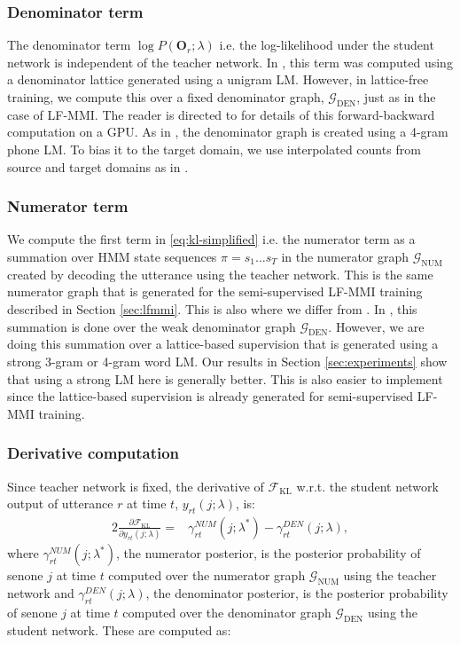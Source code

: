\documentclass{article}
\newcommand{\oOr}[1]{\mathbf{O}_{#1}}
\newcommand{\yr}[1]{y_{#1}}
\newcommand{\pr}{{P}}
\newcommand{\lat}{\mathcal{L}}
\newcommand{\DenG}{\mathcal{G}_\text{DEN}}
\newcommand{\NumG}{\mathcal{G}_\text{NUM}}
\newcommand{\NumPost}[1]{\gamma_{rt}^{NUM}(j;#1)}
\newcommand{\DenPost}[1]{\gamma_{rt}^{DEN}(j;#1)}
\newcommand{\Fkl}{\mathcal{F}_\text{KL}}
\begin{document}
\subsubsection{Denominator term}
The denominator term $\log \pr(\oOr{r}; \lambda)$ 
i.e. the log-likelihood under the student network is independent of 
the teacher network. 
In \cite{wong2016sequence-ts}, this term
was computed using a denominator lattice generated using a unigram LM. 
However, in lattice-free training, we compute this over a 
fixed denominator graph, $\DenG$, just as in the case of LF-MMI. 
The reader is directed to \cite{chain}
for details of this forward-backward \cite{rabiner1989tutorial} computation on a GPU.
As in \cite{chain}, the denominator graph is created using a 4-gram phone LM. 
To bias it to the target domain, we use interpolated counts from source and
target domains as in \cite{vimal2017mgb3}.

\subsubsection{Numerator term}
We compute the first term in \eqref{eq:kl-simplified} i.e. the numerator term 
as a summation over HMM
state sequences $\pi=s_1\dots s_T$ in the numerator graph $\NumG$ created by
decoding the utterance using the teacher network. This is the same
numerator graph that is generated for the semi-supervised LF-MMI 
training described in Section \ref{sec:lfmmi}. This is also where we
differ from \cite{kanda2017sequence-kl}. In \cite{kanda2017sequence-kl}, 
this summation is done over the weak denominator graph $\DenG$.
However, we are doing this summation over a lattice-based 
supervision that is generated using a strong 3-gram or 4-gram word LM. 
Our results in Section \ref{sec:experiments} show that using a strong LM here
is generally better. This is also easier to implement since the lattice-based 
supervision is already generated for semi-supervised LF-MMI training. 

\subsubsection{Derivative computation}
Since teacher network is fixed, the derivative of $\Fkl$ w.r.t.
the student network output of utterance $r$ at time $t$, $\yr{rt}(j;\lambda)$, is:
\begin{alignat}{2}
 \frac{\partial\Fkl}{\partial \yr{rt}(j;\lambda)} %
 =& \NumPost{\lambda^*} - \DenPost{\lambda}, \label{eq:kl-deriv} 
\end{alignat}
where 
$\NumPost{\lambda^*}$, the numerator posterior, is
the posterior probability of senone $j$ at time $t$ computed over the
numerator graph $\NumG$ using the teacher network and 
$\DenPost{\lambda}$, the denominator posterior, 
is the posterior probability of senone $j$ at time $t$ computed over
the denominator graph $\DenG$ using the student network.
These are computed as:
\end{document}
